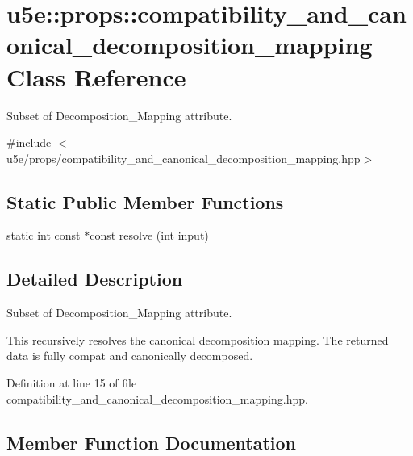 \hypertarget{classu5e_1_1props_1_1compatibility__and__canonical__decomposition__mapping}{}\section{u5e\+:\+:props\+:\+:compatibility\+\_\+and\+\_\+canonical\+\_\+decomposition\+\_\+mapping Class Reference}
\label{classu5e_1_1props_1_1compatibility__and__canonical__decomposition__mapping}


Subset of Decomposition\+\_\+\+Mapping attribute.  




{\ttfamily \#include $<$u5e/props/compatibility\+\_\+and\+\_\+canonical\+\_\+decomposition\+\_\+mapping.\+hpp$>$}

\subsection*{Static Public Member Functions}
\begin{DoxyCompactItemize}
\item 
static int const $\ast$const \hyperlink{classu5e_1_1props_1_1compatibility__and__canonical__decomposition__mapping_a200596c1d9b890d1bdd02cfaaecdf1de}{resolve} (int input)
\end{DoxyCompactItemize}


\subsection{Detailed Description}
Subset of Decomposition\+\_\+\+Mapping attribute. 

This recursively resolves the canonical decomposition mapping. The returned data is fully compat and canonically decomposed. 

Definition at line 15 of file compatibility\+\_\+and\+\_\+canonical\+\_\+decomposition\+\_\+mapping.\+hpp.



\subsection{Member Function Documentation}

